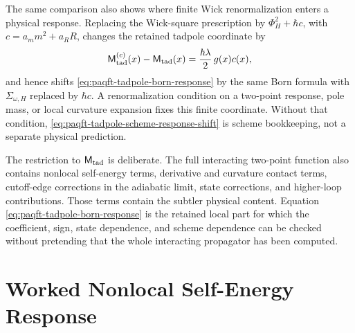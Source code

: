 The same comparison also shows where finite Wick renormalization enters a
physical response.  Replacing the Wick-square prescription by
\(\Phi_H^2+\hbar c\), with \(c=a_m m^2+a_R R\), changes the retained tadpole
coordinate by
\begin{equation}
  \mathsf M_{\rm tad}^{(c)}(x)-\mathsf M_{\rm tad}(x)
  =
  \frac{\hbar\lambda}{2}\,g(x)c(x),
  \label{eq:paqft-tadpole-scheme-response-shift}
\end{equation}
and hence shifts \eqref{eq:paqft-tadpole-born-response} by the same Born
formula with \(\Sigma_{\omega,H}\) replaced by \(\hbar c\).  A
renormalization condition on a two-point response, pole mass, or local
curvature expansion fixes this finite coordinate.  Without that condition,
\eqref{eq:paqft-tadpole-scheme-response-shift} is scheme bookkeeping, not a
separate physical prediction.

The restriction to \(\mathsf M_{\rm tad}\) is deliberate.  The full
interacting two-point function also contains nonlocal self-energy terms,
derivative and curvature contact terms, cutoff-edge corrections in the
adiabatic limit, state corrections, and higher-loop contributions.  Those
terms contain the subtler physical content.  Equation
\eqref{eq:paqft-tadpole-born-response} is the retained local part for which
the coefficient, sign, state dependence, and scheme dependence can be
checked without pretending that the whole interacting propagator has been
computed.

\section{Worked Nonlocal Self-Energy Response}
\label{sec:paqft-worked-nonlocal-self-energy-response}

